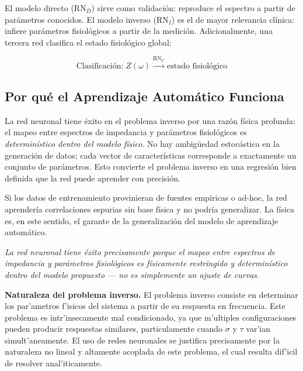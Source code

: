 \documentclass[12pt]{article}
\begin{document}
El modelo directo (RN$_D$) sirve como validaci\'on: reproduce el espectro a partir
de par\'ametros conocidos. El modelo inverso (RN$_I$) es el de mayor relevancia
cl\'inica: infiere par\'ametros fisiol\'ogicos a partir de la medici\'on.
Adicionalmente, una tercera red clasifica el estado fisiol\'ogico global:

\begin{equation}
\text{Clasificaci\'on:}\; Z(\omega)
\xrightarrow{\text{RN}_C} \text{estado fisiol\'ogico}
\end{equation}

\subsection{Por qu\'e el Aprendizaje Autom\'atico Funciona}

\label{sec:why_ml}

La red neuronal tiene \'exito en el problema inverso por una raz\'on f\'isica profunda: el mapeo
entre espectros de impedancia y par\'ametros fisiol\'ogicos es \emph{determin\'istico dentro del
modelo f\'isico}. No hay ambig\"uedad estoc\'astica en la generaci\'on de datos; cada vector de
caracter\'isticas corresponde a exactamente un conjunto de par\'ametros. Esto convierte el
problema inverso en una regresi\'on bien definida que la red puede aprender con precisi\'on.

Si los datos de entrenamiento provinieran de fuentes emp\'iricas o ad-hoc, la red aprender\'ia
correlaciones espurias sin base f\'isica y no podr\'ia generalizar. La f\'isica es, en este
sentido, el garante de la generalizaci\'on del modelo de aprendizaje autom\'atico.

\begin{center}
\textit{
La red neuronal tiene \'exito precisamente porque el mapeo entre espectros de impedancia
y par\'ametros fisiol\'ogicos es f\'isicamente restringido y determin\'istico dentro del
modelo propuesto --- no es simplemente un ajuste de curvas.
}
\end{center}

\noindent\textbf{Naturaleza del problema inverso.}
El problema inverso consiste en determinar los par'ametros f'isicos del sistema a
partir de su respuesta en frecuencia. Este problema es intr'insecamente mal
condicionado, ya que m'ultiples configuraciones pueden producir respuestas similares,
particulamente cuando $\sigma$ y $\tau$ var'ian simult'aneamente. El uso de redes
neuronales se justifica precisamente por la naturaleza no lineal y altamente acoplada
de este problema, el cual resulta dif'icil de resolver anal'iticamente.
\end{document}
